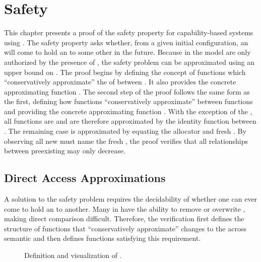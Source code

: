 \chapter{Safety}
\label{ch:safety}

This chapter presents a proof of the safety property for capability-based systems using \TMmodelName{}.
The safety property asks whether, from a given initial configuration, an \TMobj{} will come to hold an \TMaccessRight{} to some other \TMobj{} in the future.
Because \TMops{} in the model are only authorized by the presence of \TMaccessRights{}, the safety problem can be approximated using an upper bound on \TMaccessGraphs{}.
The proof begins by defining the concept of functions which ``conservatively approximate'' the \TMdirAccAGs{} of \TMsystemStates{} between \TMops{}.
It also provides the concrete approximating function \COQdirAccOp{}.
The second step of the proof follows the same form as the first, defining how functions ``conservatively approximate'' \TMpotAccAGs{} between \TMdirAcc{} functions and providing the concrete approximating function \COQpotAccOp{}.
With the exception of the \COQallocate{} \TMop{}, all \COQdirAccOp{} functions are \TMpotTransfers{} and are therefore approximated by the identity function between \TMpotAccAGs{}.
The remaining \COQallocate{} case is approximated by equating the allocator and fresh \TMobj{}.
By observing all new \TMaccessEdges{} must name the fresh \TMobj{}, the proof verifies that all \TMpotAcc{} relationships between preexisting \TMobjs{} may only decrease.

\section{Direct Access Approximations}

A solution to the safety problem requires the decidability of whether one \TMobj{} can ever come to hold an \TMaccessRight{} to another.
Many \TMops{} in \TMmodelName{} have the ability to remove or overwrite \TMcaps{}, making direct comparison difficult.
Therefore, the \TMmodelName{} verification first defines the structure of functions that ``conservatively approximate'' changes to the \TMdirAccAG{} across semantic \TMops{} and then defines functions satisfying this requirement.

\begin{figure}
  \begin{center}
    \FIGdirAccApproxCOQ{}
  \end{center}
  \COQDOCdirAccMDep{}
  \caption{Definition and visualization of \COQdirAccMDep{}.\label{fig:safety:dirAccMDep}}
\end{figure}

